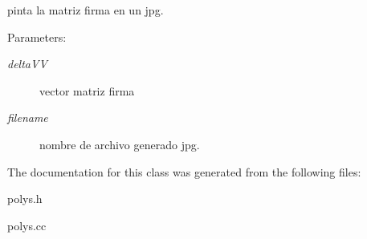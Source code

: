 pinta la matriz firma en un jpg.

\begin{Desc}
\item[Parameters:]
\begin{description}
\item[{\em deltaVV}]vector matriz firma \item[{\em filename}]nombre de archivo generado jpg. \end{description}
\end{Desc}


The documentation for this class was generated from the following files:\begin{CompactItemize}
\item 
polys.h\item 
polys.cc\end{CompactItemize}

